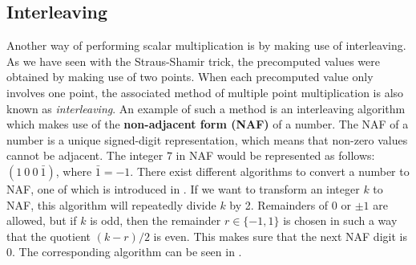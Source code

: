 \subsection{Interleaving}
Another way of performing scalar multiplication is by making use of interleaving.
As we have seen with the Straus-Shamir trick, the precomputed values were obtained by making use of two points. 
When each precomputed value only involves one point, the associated method of multiple point multiplication is also known as \emph{interleaving}.
An example of such a method is an interleaving algorithm which makes use of the \textbf{non-adjacent form (NAF)} of a number.
The NAF of a number is a unique signed-digit representation, which means that non-zero values cannot be adjacent.
The integer $7$ in NAF would be represented as follows: $(1~0~0~\bar{1})$, where $\bar{1} = - 1$.
There exist different algorithms to convert a number to NAF, one of which is introduced in \cite{hankerson2006guide}.
If we want to transform an integer $k$ to NAF, this algorithm will repeatedly divide $k$ by 2. 
Remainders of $0$ or $\pm 1$ are allowed, but if $k$ is odd, then the remainder $r \in \{-1, 1\}$ is chosen in such a way that the quotient $(k - r) / 2$ is even.
This makes sure that the next NAF digit is 0.
The corresponding algorithm can be seen in .
